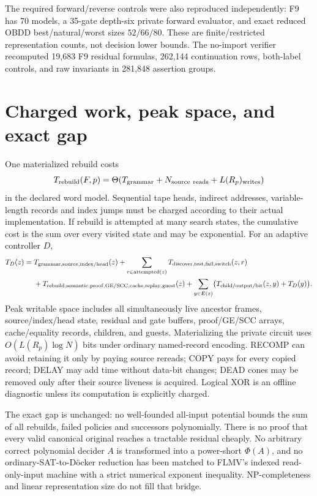 \documentclass[11pt]{article}
\begin{document}
The required forward/reverse controls were also reproduced independently: F9 has 70 models, a 35-gate depth-six private forward evaluator, and exact reduced OBDD best/natural/worst sizes $52/66/80$. These are finite/restricted representation counts, not decision lower bounds. The no-import verifier recomputed 19,683 F9 residual formulas, 262,144 continuation rows, both-label controls, and raw invariants in 281,848 assertion groups.

\section{Charged work, peak space, and exact gap}
One materialized rebuild costs
\[
 T_{\rm rebuild}(F,p)=\Theta(T_{\rm grammar}+N_{\rm source\ reads}+L(R_p)_{\rm writes})
\]
in the declared word model. Sequential tape heads, indirect addresses, variable-length records and index jumps must be charged according to their actual implementation. If rebuild is attempted at many search states, the cumulative cost is the sum over every visited state and may be exponential. For an adaptive controller $D$,
\[
\begin{split}
T_D(z)={}&T_{\rm grammar,source,index/head}(z)
+\sum_{r\in\mathrm{attempted}(z)}T_{\rm discover,test,fail,switch}(z,r)\\
&+T_{\rm rebuild,semantic,proof,GE/SCC,cache,replay,guest}(z)
+\sum_{y\in E(z)}\bigl(T_{\rm child/output/bit}(z,y)+T_D(y)\bigr).
\end{split}
\]
Peak writable space includes all simultaneously live ancestor frames, source/index/head state, residual and gate buffers, proof/GE/SCC arrays, cache/equality records, children, and guests. Materializing the private circuit uses $O(L(R_p)\log N)$ bits under ordinary named-record encoding. RECOMP can avoid retaining it only by paying source rereads; COPY pays for every copied record; DELAY may add time without data-bit changes; DEAD cones may be removed only after their source liveness is acquired. Logical XOR is an offline diagnostic unless its computation is explicitly charged.

The exact gap is unchanged: no well-founded all-input potential bounds the sum of all rebuilds, failed policies and successors polynomially. There is no proof that every valid canonical original reaches a tractable residual cheaply. No arbitrary correct polynomial decider $A$ is transformed into a power-short $\Phi(A)$, and no ordinary-SAT-to-D\"ocker reduction has been matched to FLMV's indexed read-only-input machine with a strict numerical exponent inequality. NP-completeness and linear representation size do not fill that bridge.
\end{document}
